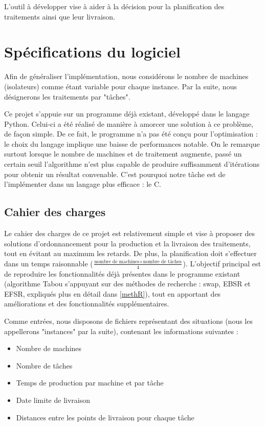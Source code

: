 \documentclass[hideweeklyreports]{polytech/polytech}
\begin{document}
		L'outil à développer vise à aider à la décision pour la planification des traitements ainsi que leur livraison.
		
	\chapter{Spécifications du logiciel} %
		Afin de généraliser l'implémentation, nous considérons le nombre de machines (isolateurs) comme étant variable pour chaque instance. Par la suite, nous désignerons les traitements par "tâches".
		
		Ce projet s'appuie sur un programme déjà existant, développé dans le langage Python. Celui-ci a été réalisé de manière à amorcer une solution à ce problème, de façon simple. De ce fait, le programme n'a pas été conçu pour l'optimisation : le choix du langage implique une baisse de performances notable. On le remarque surtout lorsque le nombre de machines et de traitement augmente, passé un certain seuil l'algorithme n'est plus capable de produire suffisamment d'itérations pour obtenir un résultat convenable. C'est pourquoi notre tâche est de l'implémenter dans un langage plus efficace : le C.
		\section{Cahier des charges}
			Le cahier des charges de ce projet est relativement simple et vise à proposer des solutions d'ordonnancement pour la production et la livraison des traitements, tout en évitant au maximum les retards. De plus, la planification doit s'effectuer dans un temps raisonnable ($\frac{\text{nombre de machines} \times \text{nombre de tâches}}{4}$). L'objectif principal est de reproduire les fonctionnalités déjà présentes dans le programme existant (algorithme Tabou s'appuyant sur des méthodes de recherche : swap, EBSR et EFSR, expliqués plus en détail dans \autoref{methR}), tout en apportant des améliorations et des fonctionnalités supplémentaires.
			
			Comme entrées, nous disposons de fichiers représentant des situations (nous les appellerons "instances" par la suite), contenant les informations suivantes :
			\begin{itemize}
				\item Nombre de machines
				\item Nombre de tâches
				\item Temps de production par machine et par tâche
				\item Date limite de livraison
				\item Distances entre les points de livraison pour chaque tâche
			\end{itemize}
			
\end{document}
